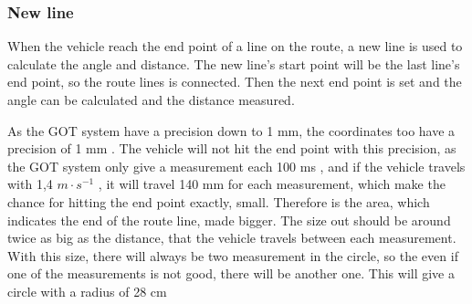 \subsubsection{New line}
When the vehicle reach the end point of a line on the route, a new line is used to calculate the angle and distance. The new line's start point will be the last line's end point, so the route lines is connected. Then the next end point is set and the angle can be calculated and the distance measured.

As the GOT system have a precision down to 1 mm, the coordinates too have a precision of 1 mm . The vehicle will not hit the end point with this precision, as the GOT system only give a measurement each 100 ms , and if the vehicle travels with 1,4 $m \cdot s^{-1}$ , it will travel 140 mm for each measurement, which make the chance for hitting the end point exactly, small. Therefore is the area, which indicates the end of the route line, made bigger. The size out should be around twice as big as the distance, that the vehicle travels between each measurement. With this size, there will always be two measurement in the circle, so the even if one of the measurements is not good, there will be another one. This will give a circle with a radius of 28 cm



